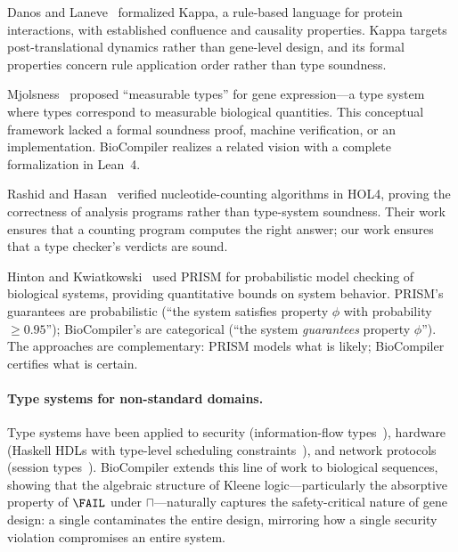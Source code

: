Danos and Laneve~\cite{danos2004formal} formalized Kappa, a rule-based
language for protein interactions, with established confluence and
causality properties.  Kappa targets post-translational dynamics rather
than gene-level design, and its formal properties concern rule
application order rather than type soundness.

Mjolsness~\cite{mjolsness2010measurable} proposed ``measurable types''
for gene expression---a type system where types correspond to measurable
biological quantities.  This conceptual framework lacked a formal
soundness proof, machine verification, or an implementation.  BioCompiler
realizes a related vision with a complete formalization in Lean~4.

Rashid and Hasan~\cite{rashid2017hol4} verified nucleotide-counting
algorithms in HOL4, proving the correctness of analysis programs rather
than type-system soundness.  Their work ensures that a counting program
computes the right answer; our work ensures that a type checker's
verdicts are sound.

Hinton and Kwiatkowski~\cite{hinton2006prism} used PRISM for
probabilistic model checking of biological systems, providing
quantitative bounds on system behavior.  PRISM's guarantees are
probabilistic (``the system satisfies property $\phi$ with probability
$\ge 0.95$''); BioCompiler's are categorical (``the system
\emph{guarantees} property $\phi$'').  The approaches are complementary:
PRISM models what is likely; BioCompiler certifies what is certain.

\paragraph{Type systems for non-standard domains.}
Type systems have been applied to security (information-flow
types~\cite{abadi2000security}), hardware (Haskell HDLs with
type-level scheduling constraints~\cite{hanna2010hardware}), and network
protocols (session types~\cite{mandel2005bidirectional}).  BioCompiler
extends this line of work to biological sequences, showing that the
algebraic structure of Kleene logic---particularly the absorptive
property of $\FAIL$ under $\sqcap$---naturally captures the
safety-critical nature of gene design: a single \FAIL{} contaminates the
entire design, mirroring how a single security violation compromises an
entire system.

